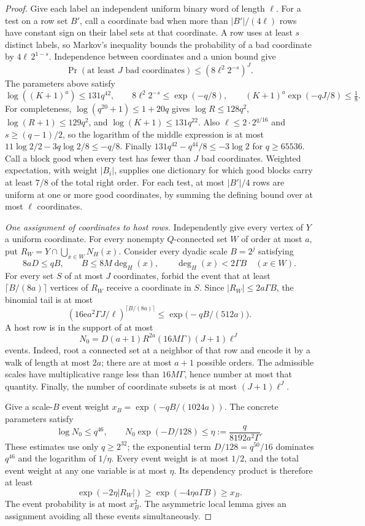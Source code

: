 \documentclass[11pt]{amsart}
\theoremstyle{definition}
\theoremstyle{remark}
\numberwithin{equation}{section}
\newcommand{\e}{\mathrm e}
\begin{document}
\begin{proof}
Give each label an independent uniform binary word of length $\ell$.
For a test on a row set $B'$, call a coordinate bad when more than
$|B'|/(4\ell)$ rows have constant sign on their label sets at that
coordinate. A row uses at least $s$ distinct labels, so Markov's
inequality bounds the probability of a bad coordinate by
$4\ell\,2^{1-s}$. Independence between coordinates and a union bound give
\[
 \Pr(\text{at least }J\text{ bad coordinates})
 \le (8\ell^2 2^{-s})^J.
\]
The parameters above satisfy
\[
 \log((K+1)^a)\le131q^{42},\qquad
 8\ell^2 2^{-s}\le \exp(-q/8),
 \qquad (K+1)^a\exp(-qJ/8)\le\tfrac18.
\]
For completeness, $\log(q^{20}+1)\le1+20q$ gives
$\log R\le128q^2$, $\log(R+1)\le129q^2$, and
$\log(K+1)\le131q^{22}$. Also $\ell\le2\cdot2^{q/16}$ and
$s\ge(q-1)/2$, so the logarithm of the middle expression is at most
$11\log2/2-3q\log2/8\le-q/8$. Finally
$131q^{42}-q^{44}/8\le-3\log2$ for $ q\ge65536$.
Call a block good when every test has fewer than $J$ bad coordinates.
Weighted expectation, with weight $|B_i|$, supplies one dictionary
for which good blocks carry at least $7/8$ of the total right order.
For each test, at most $|B'|/4$ rows are uniform at one or more good
coordinates, by summing the defining bound over at most $\ell$ coordinates.

\medskip\noindent\emph{One assignment of coordinates to host rows.}
Independently give every vertex of $Y$ a uniform coordinate. For every
nonempty $Q $-connected set $ W $ of order at most $ a$, put
$R_W=Y\cap\bigcup_{x\in W}N_H(x)$. Consider every dyadic scale $ B=2^j$
satisfying
\[
 8aD\le qB,\qquad B\le8M\deg_H(x),\qquad
 \deg_H(x)<2\Gamma B\quad(x\in W).
\]
For every set $S $ of at most $ J$ coordinates, forbid the event that at
least $\lceil B/(8a)\rceil $ vertices of $ R_W $ receive a coordinate in $ S$.
Since $|R_W|\le2a\Gamma B$, the binomial tail is at most
\[
 (16\e a^2\Gamma J/\ell)^{\lceil B/(8a)\rceil}
 \le\exp\bigl(-qB/(512a)\bigr).
\]
A host row is in the support of at most
\[
 N_0=D(a+1)R^{2a}(16M\Gamma)(J+1)\ell^J
\]
events. Indeed, root a connected set at a neighbor of that row and
encode it by a walk of length at most $2a $; there are at most $ a+1$
possible orders. The admissible scales have multiplicative range
less than $16M\Gamma$, hence number at most that quantity. Finally,
the number of coordinate subsets is at most $(J+1)\ell^J$.

Give a scale-$B $ event weight $ x_B=\exp(-qB/(1024a))$. The concrete
parameters satisfy
\[
 \log N_0\le q^{46},\qquad
 N_0\exp(-D/128)\le\eta:=\frac{q}{8192a^2\Gamma}.
\]
These estimates use only $q\ge2^{32}$; the exponential term
$D/128=q^{50}/16$ dominates $ q^{46}$ and the logarithm of $1/\eta$.
Every event weight is at most $1/2$, and the total event weight at
any one variable is at most $\eta$. Its dependency product is therefore
at least
\[
 \exp(-2\eta |R_W|)\ge\exp(-4\eta a\Gamma B)\ge x_B.
\]
The event probability is at most $x_B^2$. The asymmetric local lemma
gives an assignment avoiding all these events simultaneously.


\end{proof}
\end{document}
